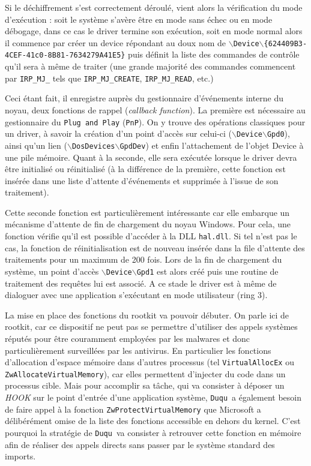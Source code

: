 \documentclass[times,11pt,fullpage]{article}
\newcommand{\Duqu}{\texttt{Duqu}}
\begin{document}
Si le déchiffrement s'est correctement déroulé, vient alors la vérification du mode d'exécution : soit le système s'avère être en mode sans échec ou en mode débogage, dans ce cas le driver termine son exécution, soit en mode normal alors il commence par créer un device répondant au doux nom de $\backslash$\texttt{Device}$\backslash$\texttt{\{624409B3-4CEF-41c0-8B81-7634279A41E5\}} puis définit la liste des commandes de contrôle qu'il sera à même de traiter (une grande majorité des commandes commencent par  \texttt{IRP\_MJ\_} tels que \texttt{IRP\_MJ\_CREATE}, \texttt{IRP\_MJ\_READ}, etc.) 

Ceci étant fait, il enregistre auprès du gestionnaire d'événements interne du noyau, deux fonctions de rappel ({\em callback function}). La première est nécessaire au gestionnaire du \texttt{Plug and Play} (\texttt{PnP}). On y trouve des opérations classiques pour un driver, à savoir la création d'un point d'accès sur celui-ci ($\backslash$\texttt{Device}$\backslash$\texttt{Gpd0}), ainsi qu'un lien ($\backslash$\texttt{DosDevices}$\backslash$\texttt{GpdDev}) et enfin l'attachement de l'objet Device à une pile mémoire. Quant à la seconde, elle sera exécutée lorsque le driver devra être initialisé ou réinitialisé (à la différence de la première, cette fonction est insérée dans une liste d'attente d'événements et supprimée à l'issue de son traitement). 
  
Cette seconde fonction est particulièrement intéressante car elle embarque un mécanisme d'attente de fin de chargement du noyau Windows. Pour cela, une fonction vérifie qu'il est possible d'accéder à la DLL \texttt{hal.dll}. Si tel n'est pas le cas, la fonction de réinitialisation est de nouveau insérée dans la file d'attente des traitements pour un maximum de 200 fois. 
Lors de la fin de chargement du système, un point d'accès $\backslash$\texttt{Device}$\backslash$\texttt{Gpd1} est alors créé puis une routine de traitement des requêtes lui est associé. A ce stade le driver est à même de dialoguer avec une application s'exécutant en mode utilisateur (ring 3). 

La mise en place des fonctions du rootkit va pouvoir débuter. On parle ici de rootkit, car ce dispositif ne peut pas se permettre d'utiliser des appels systèmes réputés pour être couramment employées par les malwares et donc particulièrement surveillées par les antivirus. En particulier les fonctions d'allocation d'espace mémoire dans d'autres processus (tel \texttt{VirtualAllocEx} ou \texttt{ZwAllocateVirtualMemory}), car elles permettent d'injecter du code dans un processus cible. Mais pour accomplir sa tâche, qui va consister à déposer un \emph{HOOK} sur le point d'entrée d'une application système, \Duqu\ a également besoin de faire appel à la fonction \texttt{ZwProtectVirtualMemory} que Microsoft a délibérément omise de la liste des fonctions accessible en dehors du kernel. C'est pourquoi la stratégie de \Duqu\ va consister à retrouver cette fonction en mémoire afin de réaliser des appels directs sans passer par le système standard des imports.
\end{document}
